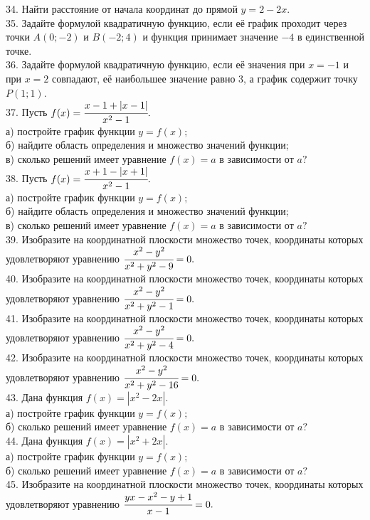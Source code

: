 \documentclass[12pt]{article}
\begin{document}
34. Найти расстояние от начала координат до прямой $y=2-2x.$\\
35. Задайте формулой квадратичную функцию, если её график проходит через точки $A(0;-2)$ и $B(-2;4)$ и функция принимает значение $-4$ в единственной точке.\\
36. Задайте формулой квадратичную функцию, если её значения при $x=-1$ и при $x=2$ совпадают, её наибольшее значение равно 3, а график содержит точку $P(1;1).$\\
37. Пусть $f(x)=\cfrac{x-1+|x-1|}{x^2-1}.$\\
а) постройте график функции $y=f(x);$\\
б) найдите область определения и множество значений функции;\\
в) сколько решений имеет уравнение $f(x)=a$ в зависимости от $a?$\\
38. Пусть $f(x)=\cfrac{x+1-|x+1|}{x^2-1}.$\\
а) постройте график функции $y=f(x);$\\
б) найдите область определения и множество значений функции;\\
в) сколько решений имеет уравнение $f(x)=a$ в зависимости от $a?$\\
39. Изобразите на координатной плоскости множество точек, координаты которых удовлетворяют уравнению $\cfrac{x^2-y^2}{x^2+y^2-9}=0.$\\
40. Изобразите на координатной плоскости множество точек, координаты которых удовлетворяют уравнению $\cfrac{x^2-y^2}{x^2+y^2-1}=0.$\\
41. Изобразите на координатной плоскости множество точек, координаты которых удовлетворяют уравнению $\cfrac{x^2-y^2}{x^2+y^2-4}=0.$\\
42. Изобразите на координатной плоскости множество точек, координаты которых удовлетворяют уравнению $\cfrac{x^2-y^2}{x^2+y^2-16}=0.$\\
43. Дана функция $f(x)=|x^2-2x|.$\\
а) постройте график функции $y=f(x);$\\
б) сколько решений имеет уравнение $f(x)=a$ в зависимости от $a?$\\
44. Дана функция $f(x)=|x^2+2x|.$\\
а) постройте график функции $y=f(x);$\\
б) сколько решений имеет уравнение $f(x)=a$ в зависимости от $a?$\\
45. Изобразите на координатной плоскости множество точек, координаты которых удовлетворяют уравнению $\cfrac{yx-x^2-y+1}{x-1}=0.$\\
\end{document}
